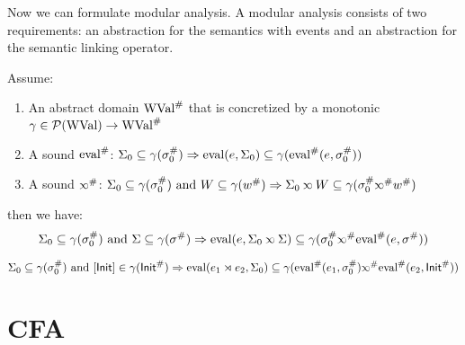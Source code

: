 \documentclass{article}
\begin{document}
Now we can formulate modular analysis.
A modular analysis consists of two requirements: an abstraction for the semantics with events and an abstraction for the semantic linking operator.
\begin{thm}
	Assume:
	\begin{enumerate}
		\item An abstract domain ${\text{WVal}}^{\#}$ that is concretized by a monotonic $\gamma\in\mathcal{P}(\text{WVal})\rightarrow{\text{WVal}}^{\#}$
		\item A sound ${\text{eval}}^{\#}$: $\Sigma_0\subseteq\gamma({\sigma}^{\#}_0)\Rightarrow\text{eval}(e,\Sigma_0)\subseteq\gamma({\text{eval}}^{\#}(e,{\sigma}^{\#}_0))$
		\item A sound $\Abs\semlink$: $\Sigma_0\subseteq\gamma(\Abs\ctx_0)\text{ and }W\subseteq\gamma(\Abs{w})\Rightarrow\Sigma_0\semlink W\subseteq\gamma(\Abs\ctx_0\Abs\semlink\Abs{w})$
	\end{enumerate}
	then we have:
	\[\Sigma_0\subseteq\gamma(\Abs\ctx_0)\text{ and }\Sigma\subseteq\gamma(\Abs\ctx)\Rightarrow\eval(e,\Sigma_0\semlink\Sigma)\subseteq\gamma(\Abs\ctx_0\Abs\semlink\Abs\eval(e,\Abs\ctx))\]
\end{thm}
\begin{cor}
	\[\Sigma_0\subseteq\gamma(\Abs\ctx_0)\text{ and }[\InitE]\in\gamma(\Abs\InitE)\Rightarrow\eval(e_1\synlink e_2,\Sigma_0)\subseteq\gamma(\Abs\eval(e_1,\Abs\ctx_0)\Abs\semlink\Abs\eval(e_2,\Abs\InitE))\]
\end{cor}
\clearpage
\section{CFA}
\end{document}
